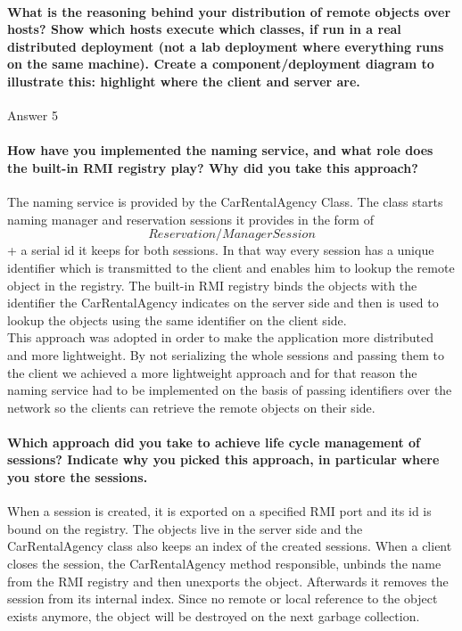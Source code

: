\documentclass{ds-report}
\begin{document}
	
	\paragraph{What is the reasoning behind your distribution of remote objects over hosts? Show which
hosts execute which classes, if run in a real distributed deployment (not a lab deployment where everything runs on the same machine). Create a component/deployment diagram to illustrate this: highlight where the client and server are.\\}
	Answer 5
	
	\paragraph{How have you implemented the naming service, and what role does the built-in RMI registry play? Why did you take this approach?\\}
    The naming service is provided by the CarRentalAgency Class. The class starts naming manager and reservation sessions it provides in the form of
    \[Reservation/ManagerSession\] + a serial id it keeps for both sessions. In that way every session has a unique identifier which is transmitted to
    the client and enables him to lookup the remote object in the registry. The built-in RMI registry binds the objects with the identifier the CarRentalAgency
    indicates on the server side and then is used to lookup the objects using the same identifier on the client side.\\
    This approach was adopted in order to make the application more distributed and more lightweight. By not serializing the whole sessions and passing them
    to the client we achieved a more lightweight approach and for that reason the naming service had to be implemented on the basis of
    passing identifiers over the network so the clients can retrieve the remote objects on their side.
	
	\paragraph{Which approach did you take to achieve life cycle management of sessions? Indicate why you picked this approach, in particular where you store the sessions.\\}
    When a session is created, it is exported on a specified RMI port and its id is bound on the registry. The objects live in the server side
    and the CarRentalAgency class also keeps an index of the created sessions. When a client closes the session, the CarRentalAgency method responsible,
    unbinds the name from the RMI registry and then unexports the object. Afterwards it removes the session from its internal index.
    Since no remote or local reference to the object exists anymore, the object will be destroyed on the next garbage collection.
	
\end{document}
